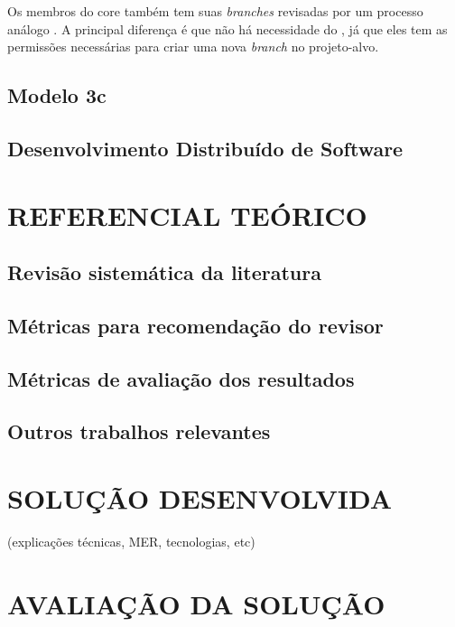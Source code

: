 \documentclass[
        12pt,
        openany, %
        oneside, %
        a4paper,
        english,
        brazil			        %
        ]{abntbibufjf}
\begin{document}
    Os membros do core também tem suas \textit{branches} revisadas por um processo análogo \cite{6385140,Bosu2014}. A principal diferença é que não há necessidade do , já que eles tem as permissões necessárias para criar uma nova \textit{branch} no projeto-alvo. 

  \section{Modelo 3c}\label{sec:modelo_3c}

  \section{Desenvolvimento Distribuído de Software}\label{sec:dds}


\chapter{REFERENCIAL TEÓRICO}\label{chap:trabalhos_relacionados}

  \section{Revisão sistemática da literatura}\label{sec:revisao_sistematica}

  \section{Métricas para recomendação do revisor}\label{sec:metricas_revisor}

  \section{Métricas de avaliação dos resultados}\label{sec:metricas_resultados}

  \section{Outros trabalhos relevantes}\label{sec:outros_trabalhos}



\chapter{SOLUÇÃO DESENVOLVIDA}\label{chap:solucao}
    (explicações técnicas, MER, tecnologias, etc)

\chapter{AVALIAÇÃO DA SOLUÇÃO}\label{chap:resultados}
\end{document}
